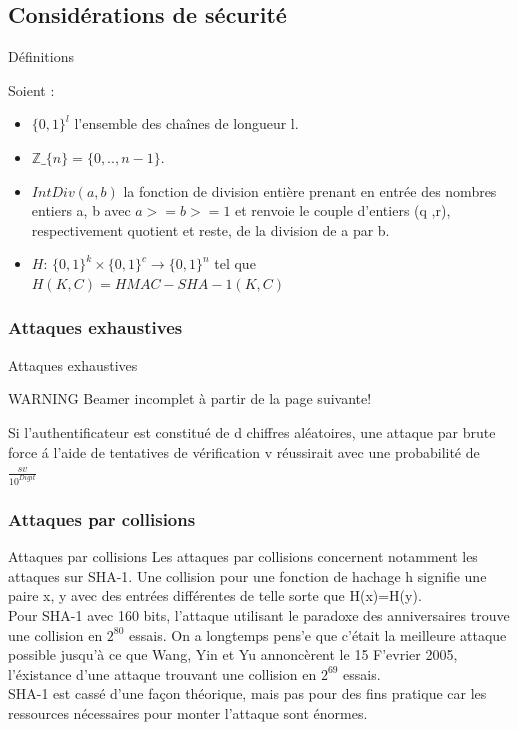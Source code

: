 \documentclass{beamer}
\begin{document}
  
  \subsection{Consid\'erations de s\'ecurit\'e}
  
\begin{frame}{D\'efinitions}

  \begin{exampleblock}{Soient :}
  \begin{itemize}
   \item $\{ 0,1 \} ^l$ l'ensemble des cha\^{i}nes de longueur l.
   \item $\mathds{Z}\_\{n\} = \{0, ..,n-1\}$.
   \item $IntDiv (a, b)$ la fonction de division enti\`{e}re prenant en entr\'{e}e des nombres entiers a, b avec $a >= b >= 1$ et renvoie le couple d'entiers (q ,r), 
   respectivement quotient et reste, de la division de a par b.
   \item $H$: $\{0,1\}^k \times{} \{0,1\}^c \rightarrow \{0,1\}^n$ tel que $H(K, C) = HMAC-SHA-1(K, C)$
  \end{itemize}
 \end{exampleblock}
\end{frame}
  

    \subsubsection{Attaques exhaustives}
    
   \begin{frame}{Attaques exhaustives}
   \begin{alertblock}{WARNING }
   Beamer incomplet \`a partir de la page suivante!
   \end{alertblock}
   Si l'authentificateur est constitu\'{e} de d chiffres al\'{e}atoires, une attaque par brute force \'{a} l'aide de tentatives de v\'{e}rification v r\'{e}ussirait avec une probabilit\'{e} de $\frac{sv}{10^{Digit}}$
   \end{frame}
    
      

    \subsubsection{Attaques par collisions}
    \begin{frame}{Attaques par collisions}
    Les attaques par collisions concernent notamment les attaques sur SHA-1. Une collision pour une fonction de hachage h signifie une paire x, y avec des entr\'{e}es 
    diff\'{e}rentes de telle sorte que H(x)=H(y).\\
    Pour SHA-1 avec 160 bits, l'attaque utilisant le paradoxe des anniversaires trouve une collision en $2^{80}$ essais. On a longtemps pens'{e} que c'\'{e}tait 
    la meilleure attaque possible jusqu'\`{a} ce que Wang, Yin et Yu annonc\`{e}rent le 15 F'{e}vrier 2005, l'\'{e}xistance d'une attaque trouvant une collision en 
    $2^{69}$ essais.\\
    SHA-1 est cass\'e d'une fa\c con th\'{e}orique, mais pas pour des fins pratique car les ressources n\'{e}cessaires pour monter l'attaque sont \'enormes.
    \end{frame}
    
\end{document}
